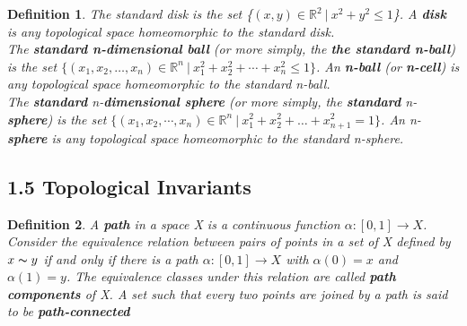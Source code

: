 \documentclass[executivepaper]{article}
\newtheorem{definition}{Definition}
\begin{document}
\begin{tcolorbox}

\begin{definition}

\textit{The \textit{standard disk} is the set \{$(x,y) \in \mathbb{R}^{2} ~ | ~ x^2+y^2 \leq 1$\}. A \textbf{disk} is any topological space homeomorphic to the standard disk. \\[2ex]
The \textbf{standard n-dimensional ball} (or more simply, the \textbf{the standard n-ball}) is the set $\{(x_{1}, x_{2}, \ldots, x_{n}) \in \mathbb{R}^{n} ~ | ~ x_{1}^{2} + x_{2}^{2} + \cdots + x_{n}^{2} \leq 1\}$. An \textbf{n-ball} (or \textbf{n-cell}) is any topological space homeomorphic to the standard n-ball.\\[2ex]
The \textbf{standard} n-\textbf{dimensional sphere} (or more simply, the \textbf{standard} n-\textbf{sphere}) is the set $\{(x_{1}, x_{2}, \cdots, x_{n}) \in \mathbb{R}^{n} ~ | ~ x_{1}^{2} + x_{2}^{2} + \ldots + x_{n+1}^{2} = 1\}$. An n-\textbf{sphere} is any topological space homeomorphic to the standard n-sphere.}

\end{definition}

\end{tcolorbox}

\pagebreak

\vspace*{-35mm}

\subsection*{1.5 Topological Invariants}

\begin{tcolorbox}

\begin{definition}

\textit{A \textbf{path} in a space X is a continuous function $\alpha: [0,1] \rightarrow X$. Consider the equivalence relation between pairs of points in a set of X defined by $x \thicksim y$ if and only if there is a path $\alpha : [0,1] \rightarrow X$ with $\alpha(0)=x$ and $\alpha(1)=y$. The equivalence classes under this relation are called \textbf{path components} of X. A set such that every two points are joined by a path is said to be \textbf{path-connected}}

\end{definition}

\end{tcolorbox}
\end{document}
